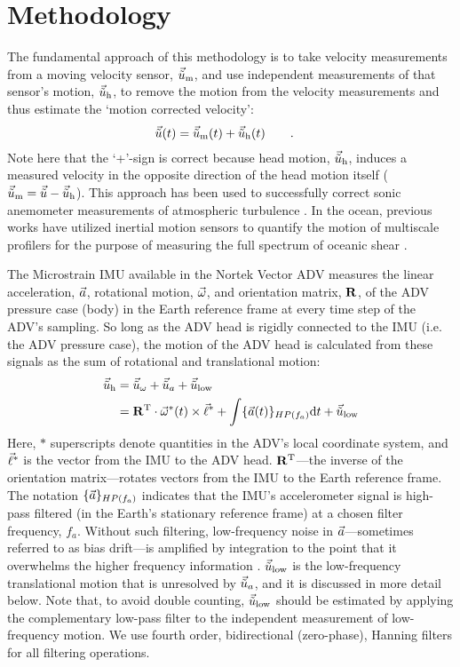 
\section{Methodology}
\label{sec:methods}


\def\ue{\ensuremath{\vec{\tilde{u}}\earth}}


The fundamental approach of this methodology is to take velocity measurements from a moving velocity sensor, $\umeas$, and use independent measurements of that sensor's motion, $\uhead$, to remove the motion from the velocity measurements and thus estimate the `motion corrected velocity':
\begin{align}
  \label{eqn:u_mot_def}
  \ue(t) & = \umeas(t) + \uhead(t) \qquad .
\end{align}
Note here that the `+'-sign is correct because head motion, $\uhead$, induces a measured velocity in the opposite direction of the head motion itself ($\umeas = \ue - \uhead$). This approach has been used to successfully correct sonic anemometer measurements of atmospheric turbulence \cite[e.g., ][]{Edson++1998, Miller++2008}.  In the ocean, previous works have utilized inertial motion sensors to quantify the motion of multiscale profilers for the purpose of measuring the full spectrum of oceanic shear \cite[]{Winkel++1996}.

The Microstrain IMU available in the Nortek Vector ADV measures the linear acceleration, ${\vec{a}}$, rotational motion, $\vec{\omega}$, and orientation matrix, $\mathbf{R}$, of the ADV pressure case (body) in the Earth reference frame at every time step of the ADV's sampling. So long as the ADV head is rigidly connected to the IMU (i.e. the ADV pressure case), the motion of the ADV head is calculated from these signals as the sum of rotational and translational motion:
\begin{align}
  \label{eqn:uhead}
\begin{split}
  \uhead & = \urot + \uacc + \ulow \\
      & = \omatinv \cdot \AngRt^*(t)\times\l + \int \{\Accel(t)\}_{HP(f_{a})} \mathrm{d}t + \ulow
\end{split}
\end{align}
Here, $*$ superscripts denote quantities in the ADV's local coordinate system, and $\vec{\ell}^*$ is the vector from the IMU to the ADV head. $\mathbf{R}^\mathrm{T}$---the inverse of the orientation matrix---rotates vectors from the IMU to the Earth reference frame. The notation $\{{\vec{a}}\}_{HP(f_a)}$ indicates that the IMU's accelerometer signal is high-pass filtered (in the Earth's stationary reference frame) at a chosen filter frequency, $f_a$. Without such filtering, low-frequency noise in ${\vec{a}}$---sometimes referred to as bias drift---is amplified by integration to the point that it overwhelms the higher frequency information \cite[]{Barshan+Whyte1995, Bevly2004, Gulmammadov2009}. $\ulow$ is the low-frequency translational motion that is unresolved by $\uacc$, and it is discussed in more detail below. Note that, to avoid double counting, $\ulow$ should be estimated by applying the complementary low-pass filter to the independent measurement of low-frequency motion. We use fourth order, bidirectional (zero-phase), Hanning filters for all filtering operations. 

